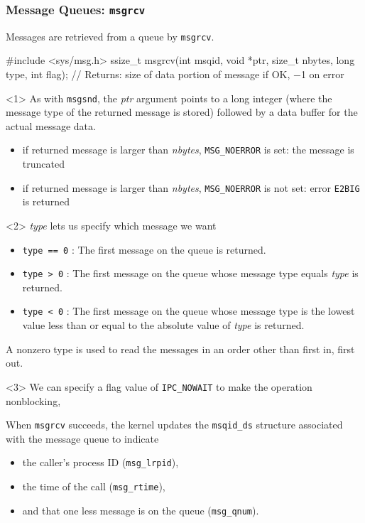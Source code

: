 \documentclass[newPxFont,sthlmFooter,nooffset]{beamer}
\begin{document}
\begin{frame}[t, fragile]
  \frametitle{Message Queues: \texttt{msgrcv}}

Messages are retrieved from a queue by \texttt{msgrcv}.
\begin{codedef}
#include <sys/msg.h>
ssize_t msgrcv(int msqid, void *ptr, size_t nbytes, long type, int flag);
// Returns: size of data portion of message if OK, −1 on error  
\end{codedef}

\begin{uncoverenv}<1>
As with \texttt{msgsnd}, the \textit{ptr} argument points to a long integer (where the message type of the returned message is stored) followed by a data buffer for the actual message data.
{\footnotesize
\begin{itemize}
\item if returned message is larger than \textit{nbytes}, \texttt{MSG\_NOERROR} is set: the message is truncated
\item if returned message is larger than \textit{nbytes}, \texttt{MSG\_NOERROR} is not set: error \texttt{E2BIG} is returned
\end{itemize}
}
\end{uncoverenv}

\begin{uncoverenv}<2>
\vspace{-3.5cm}
\textit{type} lets us specify which message we want
{\footnotesize
\begin{itemize}
\item \texttt{type == 0} : The first message on the queue is returned.
\item \texttt{type > 0} : The first message on the queue whose message type equals \textit{type} is returned.
\item \texttt{type < 0} : The first message on the queue whose message type is the lowest value less than or equal to the absolute value of \textit{type} is returned.
\end{itemize}

A nonzero type is used to read the messages in an order other than first in, first out.
}
\end{uncoverenv}

\begin{uncoverenv}<3>
We can specify a flag value of \texttt{IPC\_NOWAIT} to make the operation nonblocking,

When \texttt{msgrcv} succeeds, the kernel updates the \texttt{msqid\_ds} structure associated with the message queue to indicate
\begin{itemize}
\item the caller’s process ID (\texttt{msg\_lrpid}),
\item the time of the call (\texttt{msg\_rtime}),
\item and that one less message is on the queue (\texttt{msg\_qnum}).
\end{itemize}

\end{uncoverenv}
\end{frame}
\end{document}
